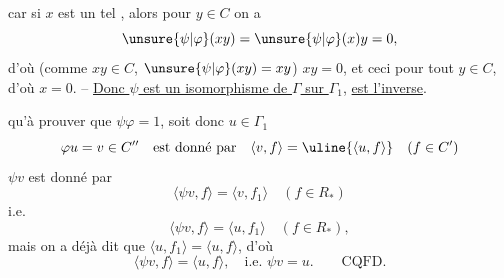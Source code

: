 car si \(x\) est un tel , alors pour \(y\in C\) on a
\[
\unsure{\psi|\varphi}(xy)=\unsure{\psi|\varphi}(x)y=0,
\]
d'où (comme \(xy\in C\),  \(\unsure{\psi|\varphi}(xy)=xy\)) \(xy=0\), et ceci pour tout \(y\in C\), d'où \(x=0\). -- \uline{Donc \(\psi\) est un isomorphisme de \(\Gamma\) sur \(\Gamma_1\)},  \uline{est l'inverse}.

 qu'à prouver que \(\psi\varphi=1\), soit donc \(u\in\Gamma_1\)
\[
\varphi u=v\in C''\quad\text{est donné par}\quad\langle v,f\rangle=\uline{\langle u,f\rangle}\quad(f\in C')
\]
 \(\psi v\) est donné par
\[
\langle\psi v,f\rangle=\langle v,f_1\rangle\quad(f\in R_*)
\]
i.e.
\[
\langle\psi v,f\rangle=\langle u,f_1\rangle\quad(f\in R_*),
\]
mais on a déjà dit que \(\langle u,f_1\rangle=\langle u,f\rangle\), d'où
\[
\langle\psi v,f\rangle=\langle u,f\rangle,\quad\text{i.e. }\psi v=u.\qquad\text{CQFD.}
\]

